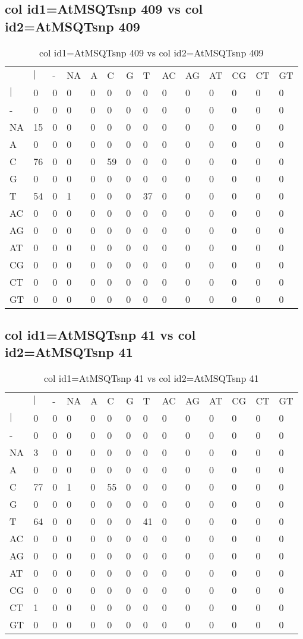 \subsection{col id1=AtMSQTsnp 409 vs col id2=AtMSQTsnp 409}
\begin{center}
\begin{longtable}{|l|l|l|l|l|l|l|l|l|l|l|l|l|l|}
\caption{col id1=AtMSQTsnp 409 vs col id2=AtMSQTsnp 409} \label{table_dm724}\\
\hline
\\
\hline
&$|$&-&NA&A&C&G&T&AC&AG&AT&CG&CT&GT\\
$|$&0&0&0&0&0&0&0&0&0&0&0&0&0\\
-&0&0&0&0&0&0&0&0&0&0&0&0&0\\
NA&15&0&0&0&0&0&0&0&0&0&0&0&0\\
A&0&0&0&0&0&0&0&0&0&0&0&0&0\\
C&76&0&0&0&59&0&0&0&0&0&0&0&0\\
G&0&0&0&0&0&0&0&0&0&0&0&0&0\\
T&54&0&1&0&0&0&37&0&0&0&0&0&0\\
AC&0&0&0&0&0&0&0&0&0&0&0&0&0\\
AG&0&0&0&0&0&0&0&0&0&0&0&0&0\\
AT&0&0&0&0&0&0&0&0&0&0&0&0&0\\
CG&0&0&0&0&0&0&0&0&0&0&0&0&0\\
CT&0&0&0&0&0&0&0&0&0&0&0&0&0\\
GT&0&0&0&0&0&0&0&0&0&0&0&0&0\\
\hline
\end{longtable}
\end{center}

\subsection{col id1=AtMSQTsnp 41 vs col id2=AtMSQTsnp 41}
\begin{center}
\begin{longtable}{|l|l|l|l|l|l|l|l|l|l|l|l|l|l|}
\caption{col id1=AtMSQTsnp 41 vs col id2=AtMSQTsnp 41} \label{table_dm726}\\
\hline
\\
\hline
&$|$&-&NA&A&C&G&T&AC&AG&AT&CG&CT&GT\\
$|$&0&0&0&0&0&0&0&0&0&0&0&0&0\\
-&0&0&0&0&0&0&0&0&0&0&0&0&0\\
NA&3&0&0&0&0&0&0&0&0&0&0&0&0\\
A&0&0&0&0&0&0&0&0&0&0&0&0&0\\
C&77&0&1&0&55&0&0&0&0&0&0&0&0\\
G&0&0&0&0&0&0&0&0&0&0&0&0&0\\
T&64&0&0&0&0&0&41&0&0&0&0&0&0\\
AC&0&0&0&0&0&0&0&0&0&0&0&0&0\\
AG&0&0&0&0&0&0&0&0&0&0&0&0&0\\
AT&0&0&0&0&0&0&0&0&0&0&0&0&0\\
CG&0&0&0&0&0&0&0&0&0&0&0&0&0\\
CT&1&0&0&0&0&0&0&0&0&0&0&0&0\\
GT&0&0&0&0&0&0&0&0&0&0&0&0&0\\
\hline
\end{longtable}
\end{center}

